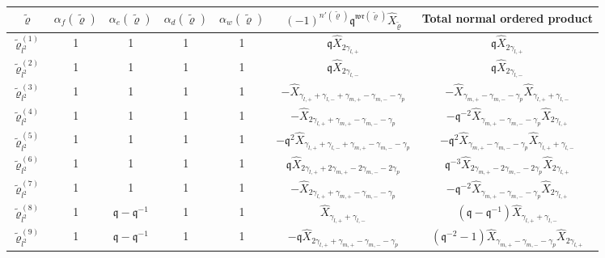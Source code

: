 \documentclass{article}
\numberwithin{equation}{section}
\newcommand{\mq}{\mathfrak{q}}
\begin{document}
\begin{center}
\begin{tabular}{|c|c|c|c|c|c|c|} 
 \hline
 $\tilde{\varrho}$ & $\alpha_f(\tilde{\varrho})$ & $\alpha_e(\tilde{\varrho})$ & $\alpha_d(\tilde{\varrho})$ & $\alpha_w(\tilde{\varrho})$ & $(-1)^{n'(\tilde{\varrho})} \mq^{\mathfrak{wr}(\tilde{\varrho})} \hat{X}_{\tilde{\varrho}}$ & Total normal ordered product \\
 \hline\hline
 $\tilde{\varrho}_{l^2}^{(1)}$ & 1 & 1 & 1 & 1 & $\mq \hat{X}_{2\gamma_{l,+}}$ & $\mq \hat{X}_{2\gamma_{l,+}}$ \\ 
 
 $\tilde{\varrho}_{l^2}^{(2)}$ & 1 & 1 & 1 & 1 & $\mq \hat{X}_{2\gamma_{l,-}}$ & $\mq \hat{X}_{2\gamma_{l,-}}$ \\
 
 $\tilde{\varrho}_{l^2}^{(3)}$ & 1 & 1 & 1 & 1 & $-\hat{X}_{\gamma_{l,+}+\gamma_{l,-}+\gamma_{m,+}-\gamma_{m,-}-\gamma_p}$ & $-\hat{X}_{\gamma_{m,+}-\gamma_{m,-}-\gamma_p}\hat{X}_{\gamma_{l,+}+\gamma_{l,-}}$ \\
 
 $\tilde{\varrho}_{l^2}^{(4)}$ & 1 & 1 & 1 & 1 & $-\hat{X}_{2\gamma_{l,+}+\gamma_{m,+}-\gamma_{m,-}-\gamma_p}$ & $-\mq^{-2}\hat{X}_{\gamma_{m,+}-\gamma_{m,-}-\gamma_p}\hat{X}_{2\gamma_{l,+}}$ \\
 
 $\tilde{\varrho}_{l^2}^{(5)}$ & 1 & 1 & 1 & 1 & $-\mq^2\hat{X}_{\gamma_{l,+}+\gamma_{l,-}+\gamma_{m,+}-\gamma_{m,-}-\gamma_p}$ & $-\mq^{2}\hat{X}_{\gamma_{m,+}-\gamma_{m,-}-\gamma_p}\hat{X}_{\gamma_{l,+}+\gamma_{l,-}}$ \\
 
 $\tilde{\varrho}_{l^2}^{(6)}$ & 1 & 1 & 1 & 1 & $\mq\hat{X}_{2\gamma_{l,+}+2\gamma_{m,+}-2\gamma_{m,-}-2\gamma_p}$ & $\mq^{-3}\hat{X}_{2\gamma_{m,+}-2\gamma_{m,-}-2\gamma_p}\hat{X}_{2\gamma_{l,+}}$ \\
 
 $\tilde{\varrho}_{l^2}^{(7)}$ & 1 & 1 & 1 & 1 & $-\hat{X}_{2\gamma_{l,+}+\gamma_{m,+}-\gamma_{m,-}-\gamma_p}$ & $-\mq^{-2}\hat{X}_{\gamma_{m,+}-\gamma_{m,-}-\gamma_p}\hat{X}_{2\gamma_{l,+}}$ \\
 
 $\tilde{\varrho}_{l^2}^{(8)}$ & 1 & $\mq-\mq^{-1}$ & 1 & 1 & $\hat{X}_{\gamma_{l,+}+\gamma_{l,-}}$ & $(\mq-\mq^{-1})\hat{X}_{\gamma_{l,+}+\gamma_{l,-}}$ \\
 
 $\tilde{\varrho}_{l^2}^{(9)}$ & 1 & $\mq-\mq^{-1}$ & 1 & 1 & $-\mq\hat{X}_{2\gamma_{l,+}+\gamma_{m,+}-\gamma_{m,-}-\gamma_p}$ & $(\mq^{-2}-1)\hat{X}_{\gamma_{m,+}-\gamma_{m,-}-\gamma_p}\hat{X}_{2\gamma_{l,+}}$ \\
 
 \hline
\end{tabular}
\end{center}
\end{document}
